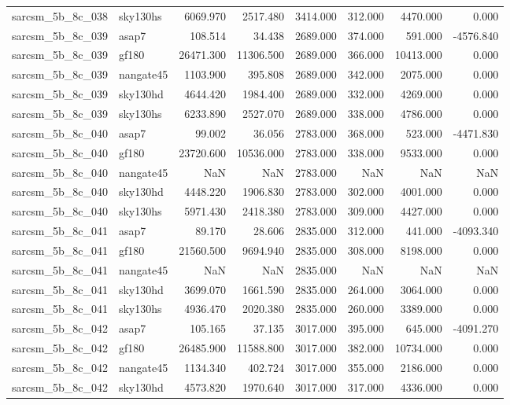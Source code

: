 \begin{tabular}{llrrrrrr}
sarcsm\_5b\_8c\_038 & sky130hs & 6069.970 & 2517.480 & 3414.000 & 312.000 & 4470.000 & 0.000 \\
sarcsm\_5b\_8c\_039 & asap7 & 108.514 & 34.438 & 2689.000 & 374.000 & 591.000 & -4576.840 \\
sarcsm\_5b\_8c\_039 & gf180 & 26471.300 & 11306.500 & 2689.000 & 366.000 & 10413.000 & 0.000 \\
sarcsm\_5b\_8c\_039 & nangate45 & 1103.900 & 395.808 & 2689.000 & 342.000 & 2075.000 & 0.000 \\
sarcsm\_5b\_8c\_039 & sky130hd & 4644.420 & 1984.400 & 2689.000 & 332.000 & 4269.000 & 0.000 \\
sarcsm\_5b\_8c\_039 & sky130hs & 6233.890 & 2527.070 & 2689.000 & 338.000 & 4786.000 & 0.000 \\
sarcsm\_5b\_8c\_040 & asap7 & 99.002 & 36.056 & 2783.000 & 368.000 & 523.000 & -4471.830 \\
sarcsm\_5b\_8c\_040 & gf180 & 23720.600 & 10536.000 & 2783.000 & 338.000 & 9533.000 & 0.000 \\
sarcsm\_5b\_8c\_040 & nangate45 & NaN & NaN & 2783.000 & NaN & NaN & NaN \\
sarcsm\_5b\_8c\_040 & sky130hd & 4448.220 & 1906.830 & 2783.000 & 302.000 & 4001.000 & 0.000 \\
sarcsm\_5b\_8c\_040 & sky130hs & 5971.430 & 2418.380 & 2783.000 & 309.000 & 4427.000 & 0.000 \\
sarcsm\_5b\_8c\_041 & asap7 & 89.170 & 28.606 & 2835.000 & 312.000 & 441.000 & -4093.340 \\
sarcsm\_5b\_8c\_041 & gf180 & 21560.500 & 9694.940 & 2835.000 & 308.000 & 8198.000 & 0.000 \\
sarcsm\_5b\_8c\_041 & nangate45 & NaN & NaN & 2835.000 & NaN & NaN & NaN \\
sarcsm\_5b\_8c\_041 & sky130hd & 3699.070 & 1661.590 & 2835.000 & 264.000 & 3064.000 & 0.000 \\
sarcsm\_5b\_8c\_041 & sky130hs & 4936.470 & 2020.380 & 2835.000 & 260.000 & 3389.000 & 0.000 \\
sarcsm\_5b\_8c\_042 & asap7 & 105.165 & 37.135 & 3017.000 & 395.000 & 645.000 & -4091.270 \\
sarcsm\_5b\_8c\_042 & gf180 & 26485.900 & 11588.800 & 3017.000 & 382.000 & 10734.000 & 0.000 \\
sarcsm\_5b\_8c\_042 & nangate45 & 1134.340 & 402.724 & 3017.000 & 355.000 & 2186.000 & 0.000 \\
sarcsm\_5b\_8c\_042 & sky130hd & 4573.820 & 1970.640 & 3017.000 & 317.000 & 4336.000 & 0.000 \\

\end{tabular}
